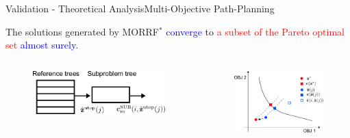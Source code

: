 \begin{frame}{Validation - Theoretical Analysis}{Multi-Objective Path-Planning}

\begin{thm}
	The solutions generated by MORRF$^{*}$ \textcolor{blue}{converge} to \textcolor{red}{a subset of the Pareto optimal set}
	\textcolor{blue}{almost surely}.
\end{thm}

\begin{columns}
	\begin{figure}
		\centering
		\includegraphics[width=.8\linewidth]{figure/cascade}
	\end{figure}
	\begin{figure}
		\centering
		\includegraphics[width=.8\linewidth]{figure/conv}
	\end{figure}
\end{columns}	
	
\end{frame}


